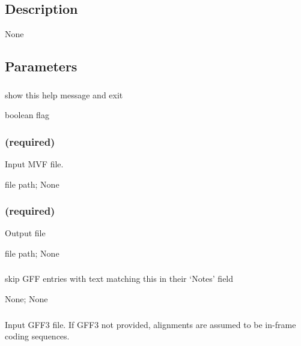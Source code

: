 \documentclass[letterpaper,11pt,english]{sphinxmanual}
\begin{document}
\subsection{Description}
\label{\detokenize{prog_desc:id129}}
None


\subsection{Parameters}
\label{\detokenize{prog_desc:id130}}

\subsubsection{}
\label{\detokenize{prog_desc:id131}}
 show this help message and exit

 boolean flag


\subsubsection{ (required)}
\label{\detokenize{prog_desc:id132}}
 Input MVF file.

 file path;  None


\subsubsection{ (required)}
\label{\detokenize{prog_desc:id133}}
 Output file

 file path;  None


\subsubsection{}
\label{\detokenize{prog_desc:id134}}
 skip GFF entries with text matching this in their ‘Notes’ field

 None;  None


\subsubsection{}
\label{\detokenize{prog_desc:id135}}
 Input GFF3 file. If GFF3 not provided, alignments are assumed to be in-frame coding sequences.
\end{document}
